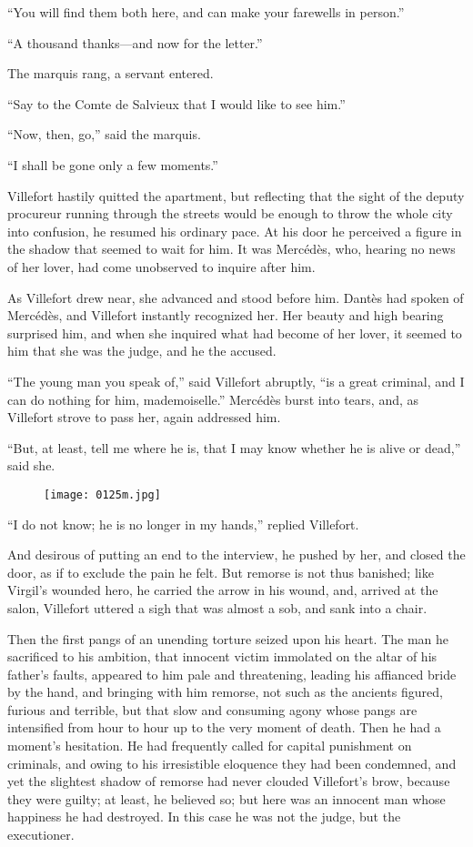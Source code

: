 “You will find them both here, and can make your farewells in person.”

“A thousand thanks—and now for the letter.”

The marquis rang, a servant entered.

“Say to the Comte de Salvieux that I would like to see him.”

“Now, then, go,” said the marquis.

“I shall be gone only a few moments.”

Villefort hastily quitted the apartment, but reflecting that the sight
of the deputy procureur running through the streets would be enough to
throw the whole city into confusion, he resumed his ordinary pace. At
his door he perceived a figure in the shadow that seemed to wait for
him. It was Mercédès, who, hearing no news of her lover, had come
unobserved to inquire after him.

As Villefort drew near, she advanced and stood before him. Dantès had
spoken of Mercédès, and Villefort instantly recognized her. Her beauty
and high bearing surprised him, and when she inquired what had become
of her lover, it seemed to him that she was the judge, and he the
accused.

“The young man you speak of,” said Villefort abruptly, “is a great
criminal, and I can do nothing for him, mademoiselle.” Mercédès burst
into tears, and, as Villefort strove to pass her, again addressed him.

“But, at least, tell me where he is, that I may know whether he is
alive or dead,” said she.

\begin{figure}[h]
\texttt{[image: 0125m.jpg]}
\end{figure}

“I do not know; he is no longer in my hands,” replied Villefort.

And desirous of putting an end to the interview, he pushed by her, and
closed the door, as if to exclude the pain he felt. But remorse is not
thus banished; like Virgil’s wounded hero, he carried the arrow in his
wound, and, arrived at the salon, Villefort uttered a sigh that was
almost a sob, and sank into a chair.

Then the first pangs of an unending torture seized upon his heart. The
man he sacrificed to his ambition, that innocent victim immolated on
the altar of his father’s faults, appeared to him pale and threatening,
leading his affianced bride by the hand, and bringing with him remorse,
not such as the ancients figured, furious and terrible, but that slow
and consuming agony whose pangs are intensified from hour to hour up to
the very moment of death. Then he had a moment’s hesitation. He had
frequently called for capital punishment on criminals, and owing to his
irresistible eloquence they had been condemned, and yet the slightest
shadow of remorse had never clouded Villefort’s brow, because they were
guilty; at least, he believed so; but here was an innocent man whose
happiness he had destroyed. In this case he was not the judge, but the
executioner.


